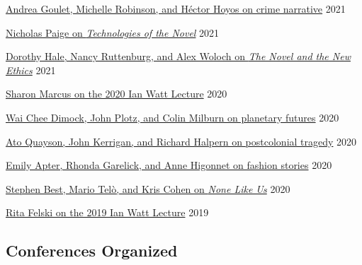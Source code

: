 \documentclass[
  12pt,
  letterpaper,
]{article}
\begin{document}
\href{https://web.archive.org/web/20220429010015/https://novel.stanford.edu/csn-cafe/2021/7/23/crime-narratives-with-andrea-goulet-michelle-robinson-and-hctor-hoyos-43021-je87a}{Andrea
Goulet, Michelle Robinson, and Héctor Hoyos on crime narrative}
\hfill 2021

\href{https://web.archive.org/web/20220429093420/https://novel.stanford.edu/csn-cafe/2021/7/23/nicholas-paige-technologies-of-the-novel-2821}{Nicholas
Paige on \emph{Technologies of the Novel}} \hfill 2021

\href{https://web.archive.org/web/20220429093353/https://novel.stanford.edu/csn-cafe/2021/7/23/books-at-the-center-dorothy-hale-the-novel-and-the-new-ethics-11521}{Dorothy
Hale, Nancy Ruttenburg, and Alex Woloch on \emph{The Novel and the New
Ethics}} \hfill 2021

\href{https://web.archive.org/web/20220429093326/https://novel.stanford.edu/csn-cafe/2021/7/23/sharon-marcus-on-her-ian-watt-lecture-103020}{Sharon
Marcus on the 2020 Ian Watt Lecture} \hfill 2020

\href{https://web.archive.org/web/20220429010109/https://novel.stanford.edu/csn-cafe/2021/7/23/wai-chee-dimock-john-plotz-and-colin-milburn-on-the-literature-of-planetary-futures-52319}{Wai
Chee Dimock, John Plotz, and Colin Milburn on planetary futures}
\hfill 2020

\href{https://web.archive.org/web/20220429010041/https://novel.stanford.edu/csn-cafe/2021/7/23/ato-quayson-john-kerrigan-and-richard-halpern-on-postcolonial-tragedy-91519}{Ato
Quayson, John Kerrigan, and Richard Halpern on postcolonial tragedy}
\hfill 2020

\href{https://web.archive.org/web/20220429093237/https://novel.stanford.edu/csn-cafe/2021/7/23/fashion-stories-emily-apter-rhonda-garelick-and-anne-higonnet-on-the-cultural-history-of-clothing-1920}{Emily
Apter, Rhonda Garelick, and Anne Higonnet on fashion stories}
\hfill 2020

\href{https://web.archive.org/web/20220429093211/https://novel.stanford.edu/csn-cafe/2021/7/23/books-at-the-center-stephen-best-mario-tel-and-kris-cohen-on-none-like-us-101019}{Stephen
Best, Mario Telò, and Kris Cohen on \emph{None Like Us}} \hfill 2020

\href{https://web.archive.org/web/20220429093144/https://novel.stanford.edu/csn-cafe/2021/7/23/rita-felski-on-her-2019-ian-watt-lecture-5319}{Rita
Felski on the 2019 Ian Watt Lecture} \hfill 2019

\hypertarget{conferences-organized}{%
\subsection{Conferences Organized}\label{conferences-organized}}
\end{document}
